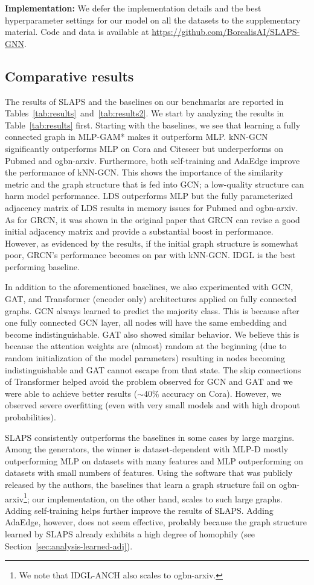 \documentclass{article}
\begin{document}
\textbf{Implementation:} We defer the implementation details and the best hyperparameter settings for our model on all the datasets to the supplementary material. Code and data is available at \href{https://github.com/BorealisAI/SLAPS-GNN}{https://github.com/BorealisAI/SLAPS-GNN}.


\subsection{Comparative results} 
The results of SLAPS and the baselines on our benchmarks are reported in Tables~\ref{tab:results}~and~\ref{tab:results2}. We start by analyzing the results in Table~\ref{tab:results} first. Starting with the baselines, we see that learning a fully connected graph in MLP-GAM* makes it outperform MLP.
kNN-GCN significantly outperforms MLP on Cora and Citeseer but underperforms on Pubmed and ogbn-arxiv. Furthermore, both self-training and AdaEdge improve the performance of kNN-GCN. This shows the importance of the similarity metric and the graph structure that is fed into GCN; a low-quality structure can harm model performance. LDS outperforms MLP but the fully parameterized adjacency matrix of LDS results in memory issues for Pubmed and ogbn-arxiv. As for GRCN, it was shown in the original paper that GRCN can revise a good initial adjacency matrix and provide a substantial boost in performance. However, as evidenced by the results, if the initial graph structure is somewhat poor, GRCN's performance becomes on par with kNN-GCN. IDGL is the best performing baseline. 

In addition to the aforementioned baselines, we also experimented with GCN, GAT, and Transformer (encoder only) architectures applied on fully connected graphs. GCN always learned to predict the majority class. This is because after one fully connected GCN layer, all nodes will have the same embedding and become indistinguishable. GAT also showed similar behavior. We believe this is because the attention weights are (almost) random at the beginning (due to random initialization of the model parameters) resulting in nodes becoming indistinguishable and GAT cannot escape from that state. The skip connections of Transformer helped avoid the problem observed for GCN and GAT and we were able to achieve better results ($\sim40\%$ accuracy on Cora). However, we observed severe overfitting (even with very small models and with high dropout probabilities).

SLAPS consistently outperforms the baselines in some cases by large margins. Among the generators, the winner is dataset-dependent with MLP-D mostly outperforming MLP on datasets with many features and MLP outperforming on datasets with small numbers of features. Using the software that was publicly released by the authors, the baselines that learn a graph structure fail on ogbn-arxiv\footnote{We note that IDGL-ANCH also scales to ogbn-arxiv.}; our implementation, on the other hand, scales to such large graphs. Adding self-training helps further improve the results of SLAPS. Adding AdaEdge, however, does not seem effective, probably because the graph structure learned by SLAPS already exhibits a high degree of homophily (see Section~\ref{sec:analysis-learned-adj}). 
\end{document}
